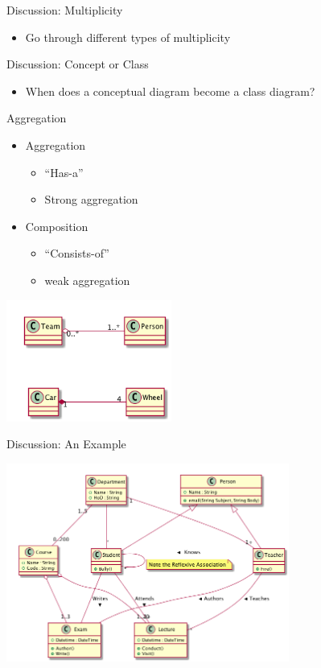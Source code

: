 \documentclass[10pt,t,a4paper]{beamer}
\begin{document}
\begin{frame}[label={sec:org37e2b4c}]{Discussion: Multiplicity}
\begin{itemize}
\item Go through different types of multiplicity
\end{itemize}
\end{frame}
\begin{frame}[label={sec:org3aa1e25}]{Discussion: Concept or Class}
\begin{itemize}
\item When does a conceptual diagram become a class diagram?
\end{itemize}
\end{frame}
\begin{frame}[label={sec:org33916c7}]{Aggregation}
\begin{itemize}
\item Aggregation
\begin{itemize}
\item ``Has-a''
\item Strong aggregation
\end{itemize}
\item Composition
\begin{itemize}
\item ``Consists-of''
\item weak aggregation
\end{itemize}
\end{itemize}

\begin{center}
\includegraphics[height=4cm]{FAggregation2.png}
\end{center}
\end{frame}
\begin{frame}[label={sec:orgf5bfe4d}]{Discussion: An Example}
\begin{center}
\includegraphics[height=6.5cm]{FExampleUniversity.png}
\end{center}
\end{frame}
\end{document}
